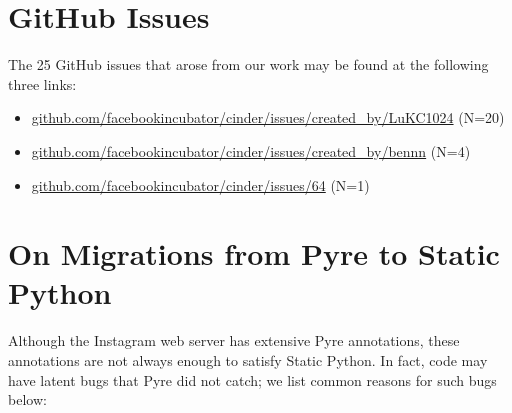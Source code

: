 \documentclass[english,cleveref,submission]{programming}
\newcommand{\shorturl}[2]{\href{#1#2}{#2}}
\newcommand{\SP}{Static Python}
\begin{document}
{\sloppy
\printbibliography
}

\appendix

\section{GitHub Issues}
\label{a:github-issues}

The 25 GitHub issues that arose from our work may be found at the following three links:

\begin{itemize}
  \item \shorturl{https://}{github.com/facebookincubator/cinder/issues/created\_by/LuKC1024} (N=20)
  \item \shorturl{https://}{github.com/facebookincubator/cinder/issues/created\_by/bennn} (N=4)
  \item \shorturl{https://}{github.com/facebookincubator/cinder/issues/64} (N=1)
\end{itemize}


\section{On Migrations from Pyre to \SP{}}

Although the Instagram web server has extensive Pyre annotations,
these annotations are not always enough to satisfy \SP{}.
In fact, code may have latent bugs that Pyre did not catch;
we list common reasons for such bugs below:
\end{document}

